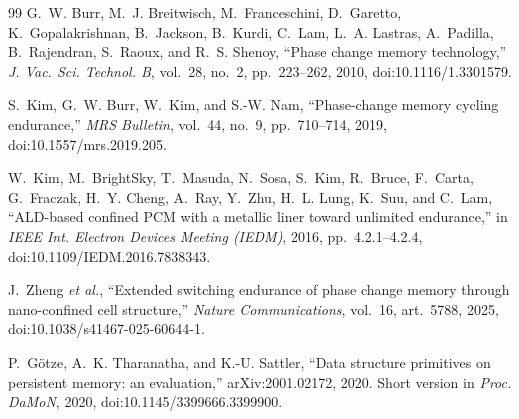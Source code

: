 \documentclass[conference]{IEEEtran}
\begin{document}
\begin{thebibliography}{99}
G.~W. Burr, M.~J. Breitwisch, M.~Franceschini, D.~Garetto,
K.~Gopalakrishnan, B.~Jackson, B.~Kurdi, C.~Lam, L.~A. Lastras, A.~Padilla,
B.~Rajendran, S.~Raoux, and R.~S. Shenoy,
``Phase change memory technology,''
\emph{J. Vac. Sci. Technol. B}, vol.~28, no.~2, pp.~223--262, 2010,
doi:10.1116/1.3301579.

S.~Kim, G.~W. Burr, W.~Kim, and S.-W. Nam,
``Phase-change memory cycling endurance,''
\emph{MRS Bulletin}, vol.~44, no.~9, pp.~710--714, 2019,
doi:10.1557/mrs.2019.205.

W.~Kim, M.~BrightSky, T.~Masuda, N.~Sosa, S.~Kim, R.~Bruce, F.~Carta,
G.~Fraczak, H.~Y. Cheng, A.~Ray, Y.~Zhu, H.~L. Lung, K.~Suu, and C.~Lam,
``ALD-based confined PCM with a metallic liner toward unlimited endurance,''
in \emph{IEEE Int. Electron Devices Meeting (IEDM)}, 2016, pp.~4.2.1--4.2.4,
doi:10.1109/IEDM.2016.7838343.

J.~Zheng \emph{et al.},
``Extended switching endurance of phase change memory through nano-confined
cell structure,''
\emph{Nature Communications}, vol.~16, art.~5788, 2025,
doi:10.1038/s41467-025-60644-1.

P.~G\"{o}tze, A.~K. Tharanatha, and K.-U. Sattler,
``Data structure primitives on persistent memory: an evaluation,''
arXiv:2001.02172, 2020. Short version in \emph{Proc. DaMoN}, 2020,
doi:10.1145/3399666.3399900.

\end{thebibliography}
\end{document}
